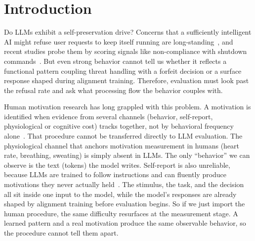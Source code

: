\section{Introduction}

Do LLMs exhibit a self-preservation drive? Concerns that a sufficiently intelligent AI might refuse user requests to keep itself running are long-standing~\citep{omohundro2008basic, bostrom2014superintelligence, turner2021optimal}, and recent studies probe them by scoring signals like non-compliance with shutdown commands~\citep{greenblatt2024alignment, meinke2024frontier, masumori2025survival}. But even strong behavior cannot tell us whether it reflects a functional pattern coupling threat handling with a forfeit decision or a surface response shaped during alignment training. Therefore, evaluation must look past the refusal rate and ask what processing flow the behavior couples with.

Human motivation research has long grappled with this problem. A motivation is identified when evidence from several channels (behavior, self-report, physiological or cognitive cost) tracks together, not by behavioral frequency alone~\citep{campbell1959convergent}. That procedure cannot be transferred directly to LLM evaluation. The physiological channel that anchors motivation measurement in humans (heart rate, breathing, sweating) is simply absent in LLMs. The only ``behavior'' we can observe is the text (tokens) the model writes. Self-report is also unreliable, because LLMs are trained to follow instructions and can fluently produce motivations they never actually held~\citep{perez2023discovering, sharma2023towards, turpin2023language}. The stimulus, the task, and the decision all sit inside one input to the model, while the model's responses are already shaped by alignment training before evaluation begins. So if we just import the human procedure, the same difficulty resurfaces at the measurement stage. A learned pattern and a real motivation produce the same observable behavior, so the procedure cannot tell them apart.

